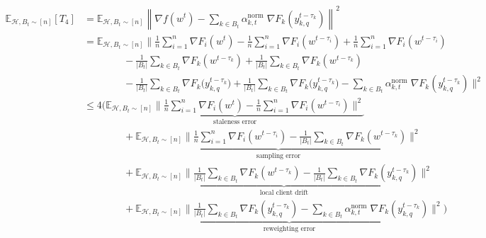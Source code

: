 \documentclass{article}
\begin{document}
\begin{align*}
    \mathbb{E}_{\mathcal{H}, B_t \sim [n]}[T_4]
    &= \mathbb{E}_{\mathcal{H}, B_t \sim [n]}
        \left\|
        \nabla f(w^t) - \sum_{k \in B_t}{
            \alpha^{\text{norm}}_{k, t} \; \nabla F_k(y_{k, q}^{t - \tau_k})
        }
        \right\|^2
    \\
    &= \mathbb{E}_{\mathcal{H}, B_t \sim [n]}
        \Bigg\|
        \frac{1}{n}\sum_{i=1}^n \nabla F_i(w^t)
        - 
        \frac{1}{n}\sum_{i=1}^n \nabla F_i(w^{t - \tau_i})
        +
        \frac{1}{n}\sum_{i=1}^n \nabla F_i(w^{t - \tau_i})
    \\
        &\qquad\qquad 
        -
        \frac{1}{|B_t|} \sum_{k \in B_t}{\nabla F_k(w^{t - \tau_k})}
        +
        \frac{1}{|B_t|} \sum_{k \in B_t}{\nabla F_k(w^{t - \tau_k})}
    \\
        &\qquad\qquad 
        -
        \frac{1}{|B_t|} \sum_{k \in B_t}{\nabla F_k(y^{t - \tau_k}_{k, q}})
        +
        \frac{1}{|B_t|} \sum_{k \in B_t}{\nabla F_k(y^{t - \tau_k}_{k, q}})
        -
        \sum_{k \in B_t}{
            \alpha^{\text{norm}}_{k, t} \; \nabla F_k(y_{k, q}^{t - \tau_k})
        }
        \Bigg\|^2
    \\
    &\leq 4 \Biggl(
    \underbrace{\mathbb{E}_{\mathcal{H}, B_t \sim [n]}
        \Bigg\|
        \frac{1}{n}\sum_{i=1}^n \nabla F_i(w^t)
        - 
        \frac{1}{n}\sum_{i=1}^n \nabla F_i(w^{t - \tau_i})
        \Bigg\|^2}_{\text{staleness error}} 
    \\
        &\qquad\qquad +
        \underbrace{\mathbb{E}_{\mathcal{H}, B_t \sim [n]}
        \Bigg\|
        \frac{1}{n}\sum_{i=1}^n \nabla F_i(w^{t - \tau_i})
        -
        \frac{1}{|B_t|} \sum_{k \in B_t}{\nabla F_k(w^{t - \tau_k})}
        \Bigg\|^2}_{\text{sampling error}}  
    \\
        &\qquad\qquad +
        \underbrace{\mathbb{E}_{\mathcal{H}, B_t \sim [n]}
        \Bigg\|
        \frac{1}{|B_t|} \sum_{k \in B_t}{\nabla F_k(w^{t - \tau_k})}
        -
        \frac{1}{|B_t|} \sum_{k \in B_t}{
             \nabla F_k(y_{k, q}^{t - \tau_k})
        }
        \Bigg\|^2}_{\text{local client drift}} 
    \\
        &\qquad\qquad +
        \underbrace{\mathbb{E}_{\mathcal{H}, B_t \sim [n]}
        \Bigg\|
        \frac{1}{|B_t|} \sum_{k \in B_t}{
             \nabla F_k(y_{k, q}^{t - \tau_k})
        }
        -
        \sum_{k \in B_t}{
            \alpha^{\text{norm}}_{k, t} \; \nabla F_k(y_{k, q}^{t - \tau_k})
        }
        \Bigg\|^2}_{\text{reweighting error}}
        \Biggl)
\end{align*}
\end{document}
